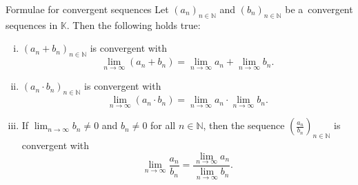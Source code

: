 \begin{Theorem}{Formulae for convergent sequences}
\label{thm:limformnormed}
  Let $(a_n)_{n\in\mathbb{N}}$ and $(b_n)_{n\in\mathbb{N}}$ be a~convergent sequences in $\mathbb{K}$. Then the following holds true:
\begin{enumerate}[(i)]
  \item $(a_n+b_n)_{n\in\mathbb{N}}$ is convergent with \[\lim_{n\to\infty}(a_n+b_n)= \lim_{n\to\infty}a_n+\lim_{n\to\infty}b_n.\]
  \item $( a_n\cdot b_n)_{n\in\mathbb{N}}$ is convergent with \[\lim_{n\to\infty}(a_n\cdot b_n)= \lim_{n\to\infty}a_n\cdot\lim_{n\to\infty}b_n.\]
  \item If $\lim_{n\to\infty}b_n\neq0$ and $b_n\neq0$ for all $n\in\mathbb{N}$, then the sequence $(\frac{a_n}{b_n})_{n\in\mathbb{N}}$ is convergent with \[\lim_{n\to\infty}\frac{a_n}{b_n}=\frac{\displaystyle\lim_{n\to\infty}a_n}{\displaystyle\lim_{n\to\infty}b_n}.\]
\end{enumerate}
\end{Theorem}
